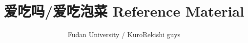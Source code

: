 \documentclass[a4paper]{article}
\begin{document}
\title{\Huge \bf 爱吃吗/爱吃泡菜 Reference Material}
\author{Fudan University / KuroRekishi guys}

\maketitle

\begin{multicols*}{2}
\tableofcontents
\end{multicols*}

\newpage

\columnseprule=0pt
\fontsize{7pt}{9pt}
\selectfont

\begin{multicols*}{2}

\end{multicols*}
\end{document}

